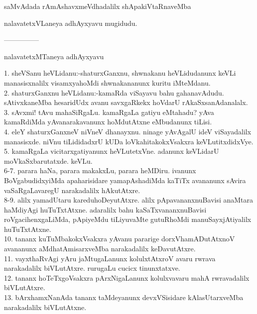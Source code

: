 \documentclass{article}
\begin{document}
\begin{center}
saMvAdada rAmAshavxmeVdhadalilx shApakiVtaRnaveMba
\end{center}

\begin{center}
nalavatetxVLaneya adhAyxyavu mugidudu.
\end{center}

\begin{center}
---------------
\end{center}

\begin{center}
nalavatetxMTaneya adhAyxyavu
\end{center}

1. sheVSanu heVLidanu:-shaturxGanxnu, shwnakanu heVLidudanunx keVLi manasisxnalilx visamxyahoMdi shwnakananunx kuritu iMteMdanu.\\
2. shaturxGanxnu heVLidanu:-kamaRda viSayavu bahu gahanavAdudu. sAtivxkaneMba hesaridUdx avanu savxgaRkekx hoVdarU rAkaSxsanAdanalalx.\\
3. sAvxmi! tAvu mahaSiRgaLu. kamaRgaLa gatiyu eMtahadu? yAva kamaRdiMda yAvanarakavanunx hoMdutAtxne eMbudanunx tiLisi.\\
4. eleY shaturxGanxneV niVneV dhanayxnu. ninage yAvAgalU ideV viSayadalilx manasisxde. niVnu tiLididadxrU kUDa loVkahitakokxVsakxra keVLutitxdidxVye.\\
5. kamaRgaLa vicitarxgatiyanunx heVLutetxVne. adanunx keVLidarU moVkaSxbarutatxde. keVLu.\\
6-7. parara haNa, parara makakxLu, parara heMDiru. ivanunx BoVgabudidxyiMda apaharisidare yamapAshadiMda kaTiTx avananunx sAvira vaSaRgaLavaregU narakadalilx hAkutAtxre.\\
8-9. alilx yamadUtaru kareduhoDeyutAtxre. alilx pApavananxnuBavisi anaMtara haMdiyAgi huTuTxtAtxne. adaralilx bahu kaSaTxvananxnuBavisi roVgacihenxgaLiMda, pApiyeMdu tiLiyuvaMte gutuRhoMdi manuSayxjAtiyalilx huTuTxtAtxne.\\
10. tananx kuTuMbakokxVsakxra yAvanu pararige dorxVhamADutAtxnoV avananunx aMdhatAmisarxveMba narakadalilx keDavutAtxre.\\
11. vayxthaRvAgi yAru jaMtugaLanunx kolulxtAtxroV avaru rwrava narakadalilx biVLutAtxre. rurugaLu cucicx tinunxtatxve.\\
12. tananx hoTeTxgoVsakxra pArxNigaLanunx kolulxvavaru mahA rwravadalilx biVLutAtxre.\\
13. bArxhamxNanAda tananx taMdeyanunx devxVSisidare kAlasUtarxveMba narakadalilx biVLutAtxne.\\
\end{document}
